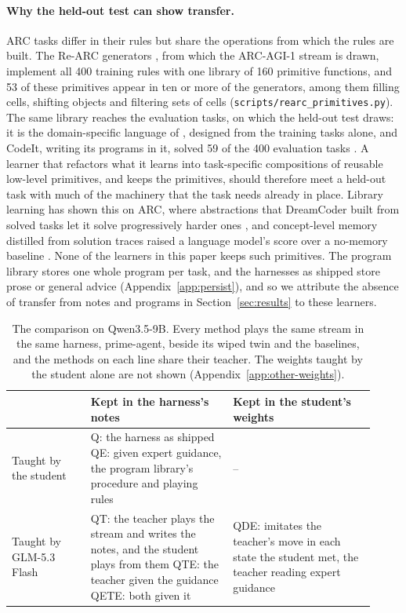 \paragraph{Why the held-out test can show transfer.} ARC tasks differ in their rules but share the operations from which the rules are built. The Re-ARC generators \citep{hodel2024rearc}, from which the ARC-AGI-1 stream is drawn, implement all 400 training rules with one library of 160 primitive functions, and 53 of these primitives appear in ten or more of the generators, among them filling cells, shifting objects and filtering sets of cells (\texttt{scripts/rearc\_primitives.py}). The same library reaches the evaluation tasks, on which the held-out test draws: it is the domain-specific language of \citet{hodel2023arcdsl}, designed from the training tasks alone, and CodeIt, writing its programs in it, solved 59 of the 400 evaluation tasks \citep{butt2024codeit}. A learner that refactors what it learns into task-specific compositions of reusable low-level primitives, and keeps the primitives, should therefore meet a held-out task with much of the machinery that the task needs already in place. Library learning has shown this on ARC, where abstractions that DreamCoder built from solved tasks let it solve progressively harder ones \citep{alford2021bidirectional}, and concept-level memory distilled from solution traces raised a language model's score over a no-memory baseline \citep{ho2025arcmemo}. None of the learners in this paper keeps such primitives. The program library stores one whole program per task, and the harnesses as shipped store prose or general advice (Appendix~\ref{app:persist}), and so we attribute the absence of transfer from notes and programs in Section~\ref{sec:results} to these learners.

\begin{table}[!h]
\centering
\footnotesize\setlength{\tabcolsep}{4pt}
\begin{tabular}{p{0.2\linewidth}p{0.36\linewidth}p{0.36\linewidth}}
\toprule
 & Kept in the harness's notes & Kept in the student's weights \\
\midrule
Taught by the student & Q: the harness as shipped \newline QE: given expert guidance, the program library's procedure and playing rules & -- \\
\addlinespace
Taught by GLM-5.3 Flash & QT: the teacher plays the stream and writes the notes, and the student plays from them \newline QTE: the teacher given the guidance \newline QETE: both given it & QDE: imitates the teacher's move in each state the student met, the teacher reading expert guidance \\
\bottomrule
\end{tabular}
\caption{The comparison on Qwen3.5-9B. Every method plays the same stream in the same harness, prime-agent, beside its wiped twin and the baselines, and the methods on each line share their teacher. The weights taught by the student alone are not shown (Appendix~\ref{app:other-weights}).}
\label{tab:design}
\end{table}

